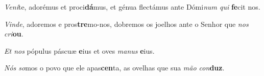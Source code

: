 \begin{greenumerate}

  \item \textit{Vení}te, adorémus et proci\textbf{dá}mus, {\GreStar} et génua flectámus ante Dómi\textit{num qui} \textbf{fe}cit nos. 


  \switchcolumn%

  \item \textit{Vinde}, adoremos e pros\textbf{tre}mo-nos, {\GreStar} dobremos os joelhos ante o Senhor que \textit{nos cri}\textbf{ou}. 

  \switchcolumn*


  \item \textit{Et nos} pópulus páscuæ \textbf{e}ius {\GreStar} et oves \textit{manus} \textbf{e}ius. 

  \switchcolumn%

  \item \textit{Nós so}mos o povo que ele apas\textbf{cen}ta, {\GreStar} as ovelhas que sua \textit{mão con}\textbf{duz}. 
\end{greenumerate}
